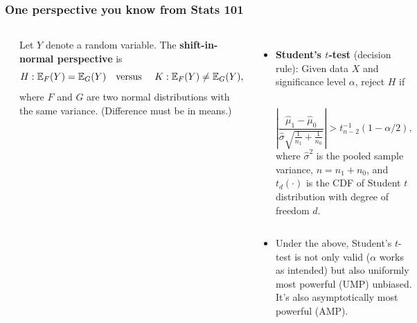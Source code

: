 \begin{frame}\frametitle{One perspective you know from Stats 101}
	\begin{columns}
        \\
	\begin{per}
	Let $Y$ denote a random variable. The \textbf{shift-in-normal perspective} is
	\vspace{-1em}
	\begin{equation*}\vspace{-1em}
		H:\mathbb{E}_F(Y)=\mathbb{E}_G(Y) \text{\quad versus \quad} K:\mathbb{E}_F(Y) \neq \mathbb{E}_G(Y),
	\end{equation*}
	where $F$ and $G$ are two \alert{normal} distributions with the \alert{same variance}. (Difference must be in means.)
	\end{per}
        \begin{itemize}

        	\item \textbf{Student's $t$-test} {\scriptsize (decision rule)}: Given data $X$ and significance level $\alpha$, reject $H$ if
        	\vspace{1em}
        	\begin{columns}[]
        		\vspace{-1em}
        		\begin{equation*}
        			\left| \frac{\hat\mu_1-\hat\mu_0}{\hat\sigma\sqrt{\frac{1}{n_1}+\frac{1}{n_0}}}
        			\right| > t^{-1}_{n-2}(1-\alpha/2),
        		\end{equation*}
        		\scriptsize
        	 where $\hat\sigma^2$ is the pooled sample variance,
	         $n=n_1+n_0$,
	         and $t_d(\cdot)$ is the CDF of Student $t$ distribution with degree of freedom $d$.
        	\end{columns}
        	\vspace{1em}
            \item Under the above, Student's $t$-test is not only \alert{valid} {\scriptsize ($\alpha$ works as intended)} but also \alert{uniformly most powerful (UMP) unbiased}. It's also \alert{asymptotically most powerful (AMP)}.
        \end{itemize}
        \vspace{1em}

	\end{columns}
\end{frame}



